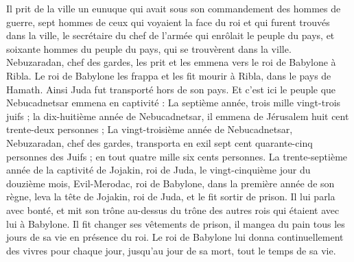 \begin{multicols}{2}
Il prit de la ville un eunuque qui avait sous son commandement des hommes de guerre, sept hommes de ceux qui voyaient la face du roi et qui furent trouvés dans la ville, le secrétaire du chef de l'armée qui enrôlait le peuple du pays, et soixante hommes du peuple du pays, qui se trouvèrent dans la ville.
Nebuzaradan, chef des gardes, les prit et les emmena vers le roi de Babylone à Ribla.
Le roi de Babylone les frappa et les fit mourir à Ribla, dans le pays de Hamath. Ainsi Juda fut transporté hors de son pays.
Et c'est ici le peuple que Nebucadnetsar emmena en captivité : La septième année, trois mille vingt-trois juifs ;
la dix-huitième année de Nebucadnetsar, il emmena de Jérusalem huit cent trente-deux personnes ;
La vingt-troisième année de Nebucadnetsar, Nebuzaradan, chef des gardes, transporta en exil sept cent quarante-cinq personnes des Juifs ; en tout quatre mille six cents personnes.
La trente-septième année de la captivité de Jojakin, roi de Juda, le vingt-cinquième jour du douzième mois, Evil-Merodac, roi de Babylone, dans la première année de son règne, leva la tête de Jojakin, roi de Juda, et le fit sortir de prison.
Il lui parla avec bonté, et mit son trône au-dessus du trône des autres rois qui étaient avec lui à Babylone.
Il fit changer ses vêtements de prison, il mangea du pain tous les jours de sa vie en présence du roi.
Le roi de Babylone lui donna continuellement des vivres pour chaque jour, jusqu'au jour de sa mort, tout le temps de sa vie.
\PPE{}
\end{multicols}
